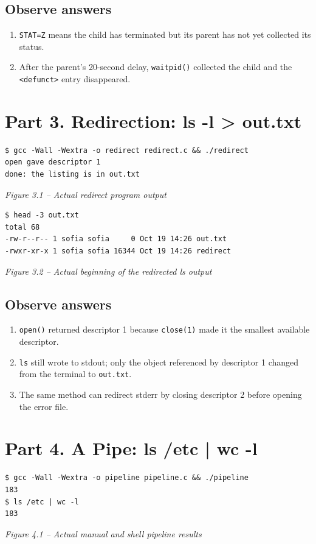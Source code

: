\documentclass[12pt,a4paper]{article}
\newcommand{\figcap}[1]{\begin{center}\small\textit{#1}\end{center}\vspace{0.4em}}
\begin{document}
\subsection{Observe answers}
\begin{enumerate}[label=\arabic*.]
\item \texttt{STAT=Z} means the child has terminated but its parent has not yet collected its status.
\item After the parent's 20-second delay, \texttt{waitpid()} collected the child and the \texttt{<defunct>} entry disappeared.
\end{enumerate}

\section{Part 3. Redirection: ls -l > out.txt}
\begin{lstlisting}
$ gcc -Wall -Wextra -o redirect redirect.c && ./redirect
open gave descriptor 1
done: the listing is in out.txt
\end{lstlisting}
\figcap{Figure 3.1 -- Actual redirect program output}

\begin{lstlisting}
$ head -3 out.txt
total 68
-rw-r--r-- 1 sofia sofia     0 Oct 19 14:26 out.txt
-rwxr-xr-x 1 sofia sofia 16344 Oct 19 14:26 redirect
\end{lstlisting}
\figcap{Figure 3.2 -- Actual beginning of the redirected ls output}

\subsection{Observe answers}
\begin{enumerate}[label=\arabic*.]
\item \texttt{open()} returned descriptor 1 because \texttt{close(1)} made it the smallest available descriptor.
\item \texttt{ls} still wrote to stdout; only the object referenced by descriptor 1 changed from the terminal to \texttt{out.txt}.
\item The same method can redirect stderr by closing descriptor 2 before opening the error file.
\end{enumerate}

\section{Part 4. A Pipe: ls /etc | wc -l}
\begin{lstlisting}
$ gcc -Wall -Wextra -o pipeline pipeline.c && ./pipeline
183
$ ls /etc | wc -l
183
\end{lstlisting}
\figcap{Figure 4.1 -- Actual manual and shell pipeline results}
\end{document}
